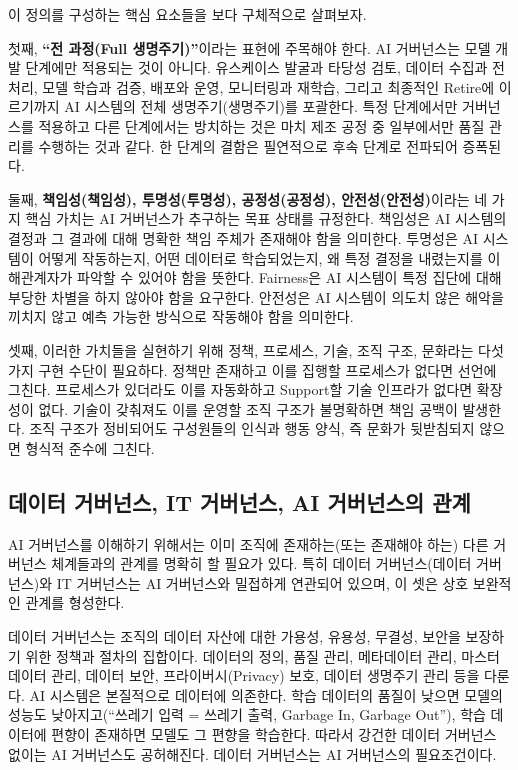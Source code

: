 이 정의를 구성하는 핵심 요소들을 보다 구체적으로 살펴보자.

첫째, \textbf{``전 과정(Full 생명주기)''}이라는 표현에 주목해야 한다. AI 거버넌스는 모델 개발 단계에만 적용되는 것이 아니다. 유스케이스 발굴과 타당성 검토, 데이터 수집과 전처리, 모델 학습과 검증, 배포와 운영, 모니터링과 재학습, 그리고 최종적인 Retire에 이르기까지 AI 시스템의 전체 생명주기(생명주기)를 포괄한다. 특정 단계에서만 거버넌스를 적용하고 다른 단계에서는 방치하는 것은 마치 제조 공정 중 일부에서만 품질 관리를 수행하는 것과 같다. 한 단계의 결함은 필연적으로 후속 단계로 전파되어 증폭된다.

둘째, \textbf{책임성(책임성), 투명성(투명성), 공정성(공정성), 안전성(안전성)}이라는 네 가지 핵심 가치는 AI 거버넌스가 추구하는 목표 상태를 규정한다.\cite{floridi2018ai4people} 책임성은 AI 시스템의 결정과 그 결과에 대해 명확한 책임 주체가 존재해야 함을 의미한다. 투명성은 AI 시스템이 어떻게 작동하는지, 어떤 데이터로 학습되었는지, 왜 특정 결정을 내렸는지를 이해관계자가 파악할 수 있어야 함을 뜻한다. Fairness은 AI 시스템이 특정 집단에 대해 부당한 차별을 하지 않아야 함을 요구한다.\cite{jobin2019global} 안전성은 AI 시스템이 의도치 않은 해악을 끼치지 않고 예측 가능한 방식으로 작동해야 함을 의미한다.\cite{hleg2019ethics}

셋째, 이러한 가치들을 실현하기 위해 정책, 프로세스, 기술, 조직 구조, 문화라는 다섯 가지 구현 수단이 필요하다. 정책만 존재하고 이를 집행할 프로세스가 없다면 선언에 그친다. 프로세스가 있더라도 이를 자동화하고 Support할 기술 인프라가 없다면 확장성이 없다. 기술이 갖춰져도 이를 운영할 조직 구조가 불명확하면 책임 공백이 발생한다. 조직 구조가 정비되어도 구성원들의 인식과 행동 양식, 즉 문화가 뒷받침되지 않으면 형식적 준수에 그친다.

\subsection{데이터 거버넌스, IT 거버넌스, AI 거버넌스의 관계}
AI 거버넌스를 이해하기 위해서는 이미 조직에 존재하는(또는 존재해야 하는) 다른 거버넌스 체계들과의 관계를 명확히 할 필요가 있다. 특히 데이터 거버넌스(데이터 거버넌스)와 IT 거버넌스는 AI 거버넌스와 밀접하게 연관되어 있으며, 이 셋은 상호 보완적인 관계를 형성한다.

데이터 거버넌스는 조직의 데이터 자산에 대한 가용성, 유용성, 무결성, 보안을 보장하기 위한 정책과 절차의 집합이다.\cite{khatri2010designing} 데이터의 정의, 품질 관리, 메타데이터 관리, 마스터 데이터 관리, 데이터 보안, 프라이버시(Privacy) 보호, 데이터 생명주기 관리 등을 다룬다. AI 시스템은 본질적으로 데이터에 의존한다. 학습 데이터의 품질이 낮으면 모델의 성능도 낮아지고(``쓰레기 입력 = 쓰레기 출력, Garbage In, Garbage Out''), 학습 데이터에 편향이 존재하면 모델도 그 편향을 학습한다. 따라서 강건한 데이터 거버넌스 없이는 AI 거버넌스도 공허해진다. 데이터 거버넌스는 AI 거버넌스의 필요조건이다.

